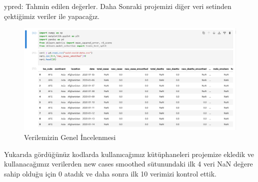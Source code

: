 \documentclass[12pt, a4paper]{article}
\begin{document}
	\newline ypred: Tahmin edilen değerler.
	\newline Daha Sonraki projemizi diğer veri setinden çektiğimiz veriler ile yapacağız.\cite{owidcoronavirus}
	\begin{figure}[!htbp] 
		
		\centering
		\includegraphics[angle=0, width=\textwidth]{1.png}
		\caption{Verilemizin Genel İncelenmesi}
		
		
	\end{figure} 
	\newline   Yukarıda gördüğünüz kodlarda kullanıcağımız kütüphaneleri projemize ekledik ve kullanacağımız verilerden new cases smoothed sütunundaki ilk 4 veri NaN değere sahip olduğu için 0 atadık ve daha sonra ilk 10 verimizi kontrol ettik.
\end{document}
